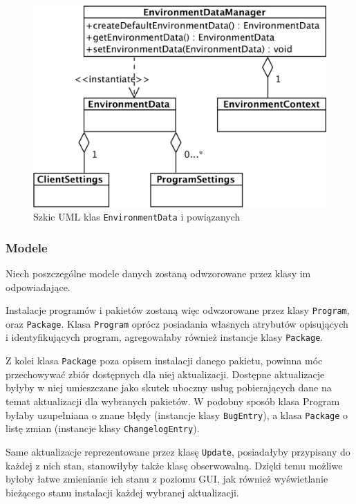 \documentclass[polish,12pt,titlepage]{article}
\begin{document}
\begin{figure}[Environment]
\centering
\includegraphics[bb=0 0 1124 773, scale=0.30]{Environment.png}
\caption{Szkic UML klas \texttt{EnvironmentData} i powiązanych}
\end{figure}

\subsubsection{Modele}

Niech poszczególne modele danych zostaną odwzorowane przez klasy im
odpowiadające.

Instalacje programów i pakietów zostaną więc odwzorowane przez klasy
\texttt{Program}, oraz \texttt{Package}. Klasa \texttt{Program} oprócz
posiadania własnych atrybutów opisujących i identyfikujących program,
agregowałaby również instancje klasy \texttt{Package}.

Z kolei klasa \texttt{Package} poza opisem instalacji danego pakietu, powinna
móc przechowywać zbiór dostępnych dla niej aktualizacji. Dostępne aktualizacje
byłyby w niej umieszczane jako skutek uboczny usług pobierających dane
na temat aktualizacji dla wybranych pakietów. W podobny sposób klasa Program
byłaby uzupełniana o znane błędy (instancje  klasy \texttt{BugEntry}), a klasa
\texttt{Package} o listę zmian (instancje klasy \texttt{ChangelogEntry}).

Same aktualizacje reprezentowane przez klasę \texttt{Update}, posiadałyby
przypisany do każdej z nich stan, stanowiłyby także klasę obserwowalną. Dzięki
temu możliwe byłoby łatwe zmienianie ich stanu z poziomu GUI, jak również
wyświetlanie bieżącego stanu instalacji każdej wybranej aktualizacji.
\end{document}
